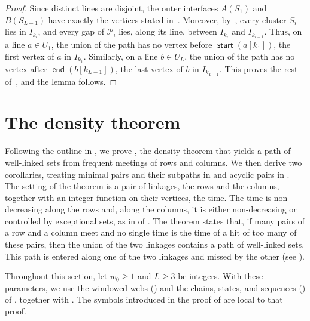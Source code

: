 \documentclass[fontsize=12pt,leading=14pt]{fullpaper}
\DeclareMathOperator{\st}{\mathsf{start}}
\DeclareMathOperator{\en}{\mathsf{end}}
\newcommand{\Pcal}{\mathcal{P}}
\newcounter{step}
\begin{document}
\begin{proof}
  Since distinct lines are disjoint, the outer interfaces $A(S_1)$ and $B(S_{L-1})$ have exactly the vertices stated in~.
  Moreover, by~, every cluster $S_i$ lies in $I_{k_i}$, and every gap of $\Pcal_i$ lies, along its line, between $I_{k_i}$ and $I_{k_{i+1}}$.
  Thus, on a line $a\in U_1$, the union of the path has no vertex before $\st(a[k_1])$, the first vertex of $a$ in $I_{k_1}$.
  Similarly, on a line $b\in U_L$, the union of the path has no vertex after $\en(b[k_{L-1}])$, the last vertex of $b$ in $I_{k_{L-1}}$.
  This proves the rest of~, and the lemma follows.
\end{proof}

%
\section{The density theorem}\label{sec:density}

Following the outline in , we prove , the density theorem that yields a path of well-linked
sets from frequent meetings of rows and columns.
We then derive two corollaries, treating minimal pairs and their subpaths in  and acyclic pairs in .
The setting of the theorem is a pair of linkages, the rows and the columns, together with an integer function on their vertices, the time.
The time is non-decreasing along the rows and, along the columns, it is either non-decreasing or controlled by exceptional sets, as in  of .
The theorem states that, if many pairs of a row and a column meet and no single time is the time of a hit of too many of these pairs, then the union of the two linkages contains a path of well-linked sets.
This path is entered along one of the two linkages and missed by the other (see ).

Throughout this section, let $w_0\ge1$ and $L\ge3$ be integers.
With these parameters, we use the windowed webs () and the chains, states, and sequences () of , together with .
The symbols introduced in the proof of  are local to that proof.
\end{document}
